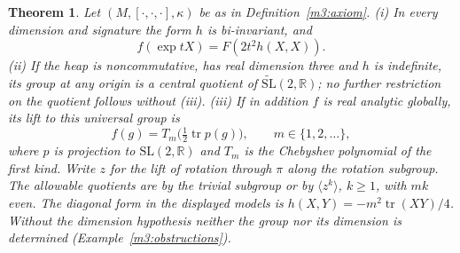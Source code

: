 \documentclass[11pt,reqno]{amsart}
\newtheorem{theorem}{Theorem}[section]
\theoremstyle{definition}
\theoremstyle{remark}
\numberwithin{equation}{section}
\newcommand{\R}{\mathbb{R}}
\newcommand{\hp}[3]{[#1,#2,#3]}
\begin{document}
\begin{theorem}\label{m3:classification}
Let $(M,\hp\cdot\cdot\cdot,\kappa)$ be as in Definition~\ref{m3:axiom}.
(i) In every dimension and signature the form \(h\) is bi-invariant, and
\[
 f(\exp tX)=F(2t^2h(X,X)).
\]
(ii) If the heap is noncommutative, has real dimension three and \(h\) is
indefinite, its group at any origin is a central quotient of
\(\widetilde{\mathrm{SL}}(2,\R)\); no further restriction on the quotient follows without (iii).
(iii) If in addition \(f\) is real analytic globally, its
lift to this universal group is
\[
 f(g)=T_m\bigl(\tfrac12\operatorname{tr}p(g)\bigr),
 \qquad m\in\{1,2,\ldots\},
\]
where \(p\) is projection to \(\mathrm{SL}(2,\R)\) and \(T_m\) is the
Chebyshev polynomial of the first kind. Write \(z\) for the lift of rotation
through \(\pi\) along the rotation subgroup. The allowable quotients are
by the trivial subgroup or by \(\langle z^k\rangle\), \(k\ge1\), with \(mk\)
even. The diagonal form in the displayed models is
\(h(X,Y)=-m^2\operatorname{tr}(XY)/4\).
Without the dimension hypothesis neither the group nor its dimension is determined (Example~\ref{m3:obstructions}).
\end{theorem}
\end{document}
